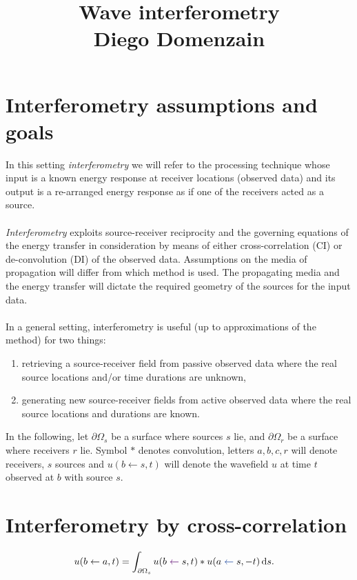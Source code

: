 \documentclass[a4paper,12pt]{article}
\title{Wave interferometry\\{\normalsize Diego Domenzain}}
\author{}
\date{}
\begin{document}
\maketitle
\section*{Interferometry assumptions and goals}
In this setting {\it interferometry} we will refer to the processing technique whose input is a known energy response at receiver locations (observed data) and its output is a re-arranged energy response as if one of the receivers acted as a source.
\\\\
{\it Interferometry} exploits source-receiver reciprocity and the governing equations of the energy transfer in consideration by means of either cross-correlation (CI) or de-convolution (DI) of the observed data. Assumptions on the media of propagation will differ from which method is used. The propagating media and the energy transfer will dictate the required geometry of the sources for the input data.
\\\\
In a general setting, interferometry is useful (up to approximations of the method) for two things: 
\begin{enumerate}
\item retrieving a source-receiver field from passive observed data where the real source locations and/or time durations are unknown,
\item generating new source-receiver fields from active observed data where the real source locations and durations are known.
\end{enumerate}
%
\vspace{0.5em}
In the following, let $\partial\Omega_s$ be a surface where sources $s$ lie, and $\partial\Omega_r$ be a surface where receivers $r$ lie. Symbol $*$ denotes convolution, letters $a,b,c,r$ will denote receivers, $s$ sources and $u(b\gets s,t)$ will denote the wavefield $u$ at time $t$ observed at $b$ with source $s$.
\section*{Interferometry by cross-correlation}
\begin{align}
u(b\gets a,t) &= \int_{\partial\Omega_s} u(b\color{moradoAmor}\gets\color{black}s,t)*u(a\color{boiseBlue}\gets\color{black}s,-t)\,{\rm d}s.
\label{eqn:ci}
\end{align}
\end{document}

